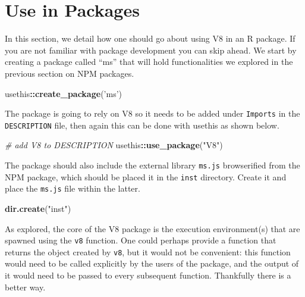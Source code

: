 \documentclass[10pt,]{krantz}
\makeatletter
\newenvironment{Shaded}{\begin{snugshade}}{\end{snugshade}}
\newcommand{\CommentTok}[1]{\textcolor[rgb]{0.37,0.37,0.37}{\textit{#1}}}
\newcommand{\KeywordTok}[1]{\textcolor[rgb]{0.27,0.27,0.27}{\textbf{#1}}}
\newcommand{\NormalTok}[1]{#1}
\newcommand{\OperatorTok}[1]{\textcolor[rgb]{0.43,0.43,0.43}{\textbf{#1}}}
\newcommand{\StringTok}[1]{\textcolor[rgb]{0.5,0.5,0.5}{#1}}
\newenvironment{kframe}{%
\medskip{}
\setlength{\fboxsep}{.8em}
 \def\at@end@of@kframe{}%
 \ifinner\ifhmode%
  \def\at@end@of@kframe{\end{minipage}}%
  \begin{minipage}{\columnwidth}%
 \fi\fi%
 \def\FrameCommand##1{\hskip\@totalleftmargin \hskip-\fboxsep
 \colorbox{shadecolor}{##1}\hskip-\fboxsep
     \hskip-\linewidth \hskip-\@totalleftmargin \hskip\columnwidth}%
 \MakeFramed {\advance\hsize-\width
   \@totalleftmargin\z@ \linewidth\hsize
   \@setminipage}}%
 {\par\unskip\endMakeFramed%
 \at@end@of@kframe}
\renewenvironment{Shaded}{\begin{kframe}}{\end{kframe}}
\makeatother
\begin{document}
\hypertarget{v8-pkg}{%
\section{Use in Packages}\label{v8-pkg}}

In this section, we detail how one should go about using V8 in an R package. If you are not familiar with package development you can skip ahead. We start by creating a package called ``ms'' that will hold functionalities we explored in the previous section on NPM packages.

\begin{Shaded}
\begin{Highlighting}[]
\NormalTok{usethis}\OperatorTok{::}\KeywordTok{create_package}\NormalTok{(}\StringTok{'ms'}\NormalTok{)}
\end{Highlighting}
\end{Shaded}

The package is going to rely on V8 so it needs to be added under \texttt{Imports} in the \texttt{DESCRIPTION} file, then again this can be done with usethis as shown below.

\begin{Shaded}
\begin{Highlighting}[]
\CommentTok{# add V8 to DESCRIPTION}
\NormalTok{usethis}\OperatorTok{::}\KeywordTok{use_package}\NormalTok{(}\StringTok{"V8"}\NormalTok{)}
\end{Highlighting}
\end{Shaded}

The package should also include the external library \texttt{ms.js} browserified from the NPM package, which should be placed it in the \texttt{inst} directory. Create it and place the \texttt{ms.js} file within the latter.

\begin{Shaded}
\begin{Highlighting}[]
\KeywordTok{dir.create}\NormalTok{(}\StringTok{"inst"}\NormalTok{)}
\end{Highlighting}
\end{Shaded}

As explored, the core of the V8 package is the execution environment(s) that are spawned using the \texttt{v8} function. One could perhaps provide a function that returns the object created by \texttt{v8}, but it would not be convenient: this function would need to be called explicitly by the users of the package, and the output of it would need to be passed to every subsequent function. Thankfully there is a better way.
\end{document}
